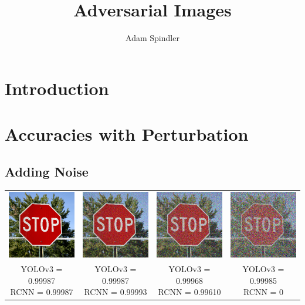 \documentclass{article}
\title{Adversarial Images}
\author{Adam Spindler}
\begin{document}
\maketitle

\section{Introduction}

\section{Accuracies with Perturbation}

\subsection{Adding Noise}
\begin{center}
\begin{tabular}{ c c c c }
    \includegraphics[width=0.2\linewidth]{../test_images/stop.png} & \includegraphics[width=0.2\linewidth]{../test_images/perturbed/stop_noise_100.png} & \includegraphics[width=0.2\linewidth]{../test_images/perturbed/stop_noise_200.png} & \includegraphics[width=0.2\linewidth]{../test_images/perturbed/stop_noise_500.png} \\
    \makecell{YOLOv3 = 0.99987 \\ RCNN = 0.99987} & \makecell{YOLOv3 = 0.99987 \\ RCNN = 0.99993} & \makecell{YOLOv3 = 0.99968 \\ RCNN = 0.99610} & \makecell{YOLOv3 = 0.99985 \\ RCNN = 0} \\  

\end{tabular}
\end{center}
\end{document}
